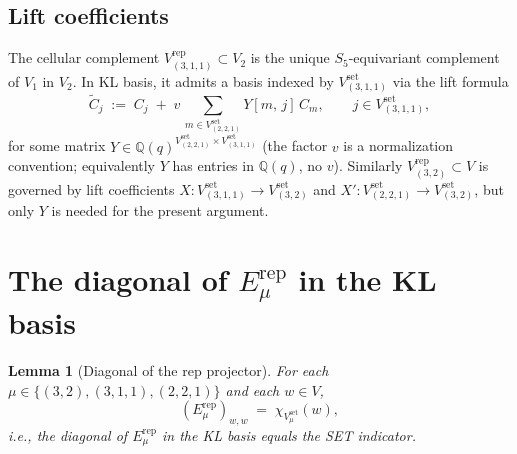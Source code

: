 \documentclass[11pt]{article}
\newtheorem{lemma}[theorem]{Lemma}
\theoremstyle{definition}
\begin{document}
\subsection*{Lift coefficients}

The cellular complement $V_{(3,1,1)}^{\mathrm{rep}} \subset V_2$ is the unique $S_5$-equivariant complement of $V_1$ in $V_2$. In KL basis, it admits a basis indexed by $V_{(3,1,1)}^{\mathrm{set}}$ via the lift formula
\begin{equation}\label{eq:lift}
\widetilde C_j \;:=\; C_j \;+\; v\,\sum_{m \in V_{(2,2,1)}^{\mathrm{set}}} Y[m,\,j]\, C_m, \qquad j \in V_{(3,1,1)}^{\mathrm{set}},
\end{equation}
for some matrix $Y \in \mathbb{Q}(q)^{V_{(2,2,1)}^{\mathrm{set}} \times V_{(3,1,1)}^{\mathrm{set}}}$ (the factor $v$ is a normalization convention; equivalently $Y$ has entries in $\mathbb{Q}(q)$, no $v$). Similarly $V_{(3,2)}^{\mathrm{rep}} \subset V$ is governed by lift coefficients $X: V_{(3,1,1)}^{\mathrm{set}} \to V_{(3,2)}^{\mathrm{set}}$ and $X': V_{(2,2,1)}^{\mathrm{set}} \to V_{(3,2)}^{\mathrm{set}}$, but only $Y$ is needed for the present argument.

\section{The diagonal of $E_\mu^{\mathrm{rep}}$ in the KL basis}\label{sec:diag}

\begin{lemma}[Diagonal of the rep projector]\label{lem:diag}
For each $\mu \in \{(3,2), (3,1,1), (2,2,1)\}$ and each $w \in V$,
\begin{equation}\label{eq:diag-eq-set}
(E_\mu^{\mathrm{rep}})_{w,w} \;=\; \chi_{V_\mu^{\mathrm{set}}}(w),
\end{equation}
i.e., the diagonal of $E_\mu^{\mathrm{rep}}$ in the KL basis equals the SET indicator.
\end{lemma}
\end{document}
